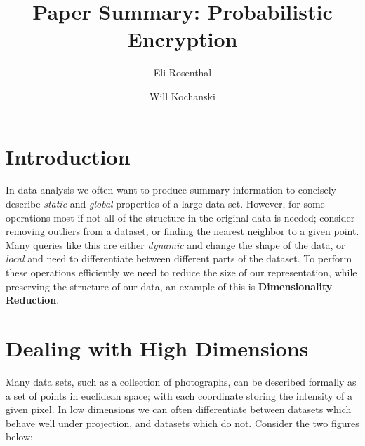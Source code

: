 \documentclass[11pt]{article}
\author{Eli Rosenthal \and Will Kochanski}
\date{}
\title{Paper Summary: Probabilistic Encryption}
\begin{document}
\maketitle
\section{Introduction}
In data analysis we often want to produce summary information to concisely describe \textit{static} and \textit{global} properties of a large data set. However, for some operations most if not all of the structure in the original data is needed; consider removing outliers from a dataset, or finding the nearest neighbor to a given point. Many queries like this are either \textit{dynamic} and change the shape of the data, or \textit{local} and need to differentiate between different parts of the dataset. To perform these operations efficiently we need to reduce the size of our representation, while preserving the structure of our data, an example of this is \textbf{Dimensionality Reduction}.

\section{Dealing with High Dimensions}
Many data sets, such as a collection of photographs, can be described formally as a set of points in euclidean space; with each coordinate storing the intensity of a given pixel. In low dimensions we can often differentiate between datasets which behave well under projection, and datasets which do not. Consider the two figures below:
\end{document}
